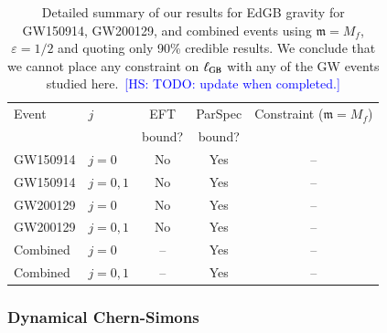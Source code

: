 \documentclass[twocolumn,prd,aps,superscriptaddress,preprintnumbers,tightenlines,showpacs,nofootinbib,amsfonts,amsmath,longbibliography]{revtex4-1}
\newcommand{\gm}{\mathfrak{m}}
\newcommand{\hs}[1]{{\textcolor{blue}{{[HS: #1]}} }}
\begin{document}
\begin{table}[h]
\begin{tabular}{l l c c c}
\hline
\hline
Event & $j$ & EFT    & ParSpec & Constraint ($\gm = M_{f}$) \\
      &     & bound? & bound?  &                            \\
\hline
GW150914 & $j = 0$    & No  & Yes & -- \\
GW150914 & $j = 0, 1$ & No  & Yes & -- \\
GW200129 & $j = 0$    & No  & Yes & -- \\
GW200129 & $j = 0, 1$ & No  & Yes & -- \\
Combined & $j = 0$    & --  & Yes & -- \\
Combined & $j = 0, 1$ & --  & Yes & -- \\
\hline
\hline
\end{tabular}
\caption{Detailed summary of our results for EdGB gravity for GW150914, GW200129, and
combined events using $\gm = M_{f}$, $\varepsilon = 1/2$ and quoting only 90\% credible results.
%
We conclude that we cannot place any constraint on $\ell_{\rm GB}$ with any of the GW events
studied here.~\hs{TODO: update when completed.}
}
\label{tab:summary_edgb}
\end{table}

\subsubsection{Dynamical Chern-Simons}
\label{sec:results_dcs}
\end{document}
